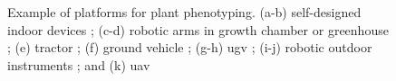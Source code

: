 \begin{figure}[htb!]
  \begin{center}
  \end{center}
  \caption[Example of platforms for plant phenotyping]{
    Example of platforms for plant phenotyping. (a-b) self-designed indoor devices \citep{wu_mvs-pheno_2020,schunck_pheno4d_2021}; (c-d) robotic arms in growth chamber or greenhouse \citep{chaudhury_machine_2018, du_greenhouse_2021}; (e) tractor \citep{kusumam_3d_2017}; (f) ground vehicle \citep{liu_estimation_2017}; (g-h) \gls{ugv} \citep{mcguire_high_2021, qiu_field-based_2019}; (i-j) robotic outdoor instruments \citep{bai_nu-spidercam_2019, jin_exploring_2021}; and (k) \gls{uav} \citep{kierdorf_growliflower_2022}
  }
  \label{fig:int1}
\end{figure}